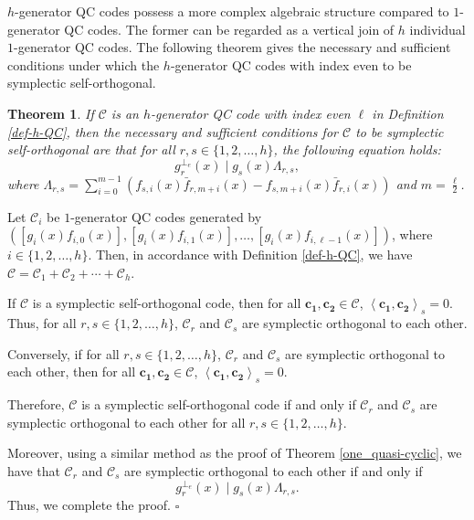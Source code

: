 \documentclass[journal]{IEEEtran}
\newtheorem{theorem}{Theorem}
\newenvironment{proof}{{\noindent\it Proof:} }{\hfill $\square$\par}
\begin{document}
$h$-generator QC codes possess a more complex algebraic structure compared to $1$-generator QC codes. The former can be regarded as a vertical join of $h$ individual $1$-generator QC codes.  The following theorem gives the necessary and sufficient conditions under which the $h$-generator QC codes with index even to be symplectic self-orthogonal.




\begin{theorem}\label{theo-h-QC} 
	If $\mathscr{C}$ is an $h$-generator QC code with index even $\ell$ in Definition \ref{def-h-QC}, then the necessary and sufficient conditions for $\mathscr{C}$ to be symplectic self-orthogonal are that for all $r,s \in\{1,2, \ldots, h\}$, the following equation holds:
 	 \begin{equation}\label{h_sym_quasi-cyclic}
			g_{r}^{\perp_{e}}(x) \mid g_{s}(x)\Lambda_{r,s}, 
	\end{equation} where  $\Lambda_{r,s}=\sum\limits^{m-1}_{i=0} (f_{s, i}(x) \bar{f}_{r, m+i}(x)-f_{s, m+i}(x) \bar{f}_{r, i}(x))$ and $m=\frac{\ell}{2}$.
\end{theorem}
\begin{proof}  
Let $\mathscr{C}_i$ be $1$-generator QC codes generated by $(\left[g_{i}(x) f_{i,0}(x)\right], \left[g_{i}(x) f_{i,1}(x)\right], \ldots, \left[g_{i}(x) f_{i, \ell-1}(x)\right])$, where $i \in \{1,2, \ldots, h\}$.  
Then, in accordance with Definition \ref{def-h-QC}, we have $\mathscr{C} = \mathscr{C}_1 + \mathscr{C}_2 + \cdots + \mathscr{C}_h$.  
  
If $\mathscr{C}$ is a symplectic self-orthogonal code, then for all $\mathbf{c_1}, \mathbf{c_2} \in \mathscr{C}$, $\left\langle \mathbf{c_1}, \mathbf{c_2} \right\rangle_s = 0$. Thus, for all $r, s \in \{1,2, \ldots, h\}$, $\mathscr{C}_r$ and $\mathscr{C}_s$ are symplectic orthogonal to each other.  
  
Conversely, if for all $r, s \in \{1,2, \ldots, h\}$, $\mathscr{C}_r$ and $\mathscr{C}_s$ are symplectic orthogonal to each other, then for all $\mathbf{c_1}, \mathbf{c_2} \in \mathscr{C}$, $\left\langle \mathbf{c_1}, \mathbf{c_2} \right\rangle_s = 0$.   
  
Therefore, $\mathscr{C}$ is a symplectic self-orthogonal code if and only if $\mathscr{C}_r$ and $\mathscr{C}_s$ are symplectic orthogonal to each other for all $r, s \in \{1,2, \ldots, h\}$.  
  
Moreover, using a similar method as the proof of Theorem \ref{one_quasi-cyclic}, we have that $\mathscr{C}_r$ and $\mathscr{C}_s$ are symplectic orthogonal to each other if and only if  
\begin{equation}  
g_{r}^{\perp_{e}}(x) \mid g_{s}(x)\Lambda_{r,s}.  
\end{equation}  
Thus, we complete the proof.  
\end{proof}
\end{document}

